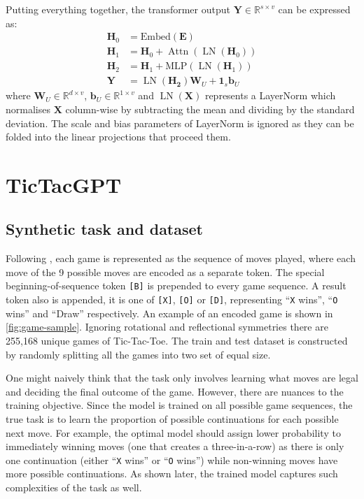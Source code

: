 \documentclass{article}
\newcommand{\ttgpt}{TicTacGPT\xspace}
\newcommand{\ttt}{Tic-Tac-Toe\xspace}
\renewcommand{\v}[1]{\mathbf{\bm{#1}}}
\newcommand{\m}[1]{\mathbf{\bm{#1}}}
\newcommand{\R}{\mathbb{R}}
\DeclareMathOperator{\layernorm}{LN}
\DeclareMathOperator{\attn}{Attn}
\begin{document}
Putting everything together, the transformer output $\m{Y} \in \R^{s \times v}$ can be expressed as:
\begin{equation}  \label{eq:transformer}
    \begin{aligned}
        \m{H}_0 & = \text{Embed}(\m{E})                           \\
        \m{H}_1 & = \m{H}_0 + \attn(\layernorm(\m{H}_0))          \\
        \m{H}_2 & = \m{H}_1 + \text{MLP}(\layernorm(\m{H}_1))     \\
        \m{Y}   & = \layernorm(\m{H_2}) \m{W}_U + \v{1}_s \v{b}_U
    \end{aligned}
\end{equation}
where $\m{W}_U \in \R^{d \times v}$, $\v{b}_U \in \R ^{1 \times v}$ and $\layernorm(\m{X})$ represents a LayerNorm which normalises $\m{X}$ column-wise by subtracting the mean and dividing by the standard deviation. The scale and bias parameters of LayerNorm is ignored as they can be folded into the linear projections that proceed them.

\section{\ttgpt}

\subsection{Synthetic task and dataset}



Following \cite{orthello-gpt}, each game is represented as the sequence of moves played, where each move of the 9 possible moves are encoded as a separate token. The special beginning-of-sequence token \texttt{[B]} is prepended to every game sequence. A result token also is appended, it is one of \texttt{[X]}, \texttt{[O]} or \texttt{[D]}, representing ``\texttt{X} wins'', ``\texttt{O} wins'' and ``Draw'' respectively. An example of an encoded game is shown in \cref{fig:game-sample}. Ignoring rotational and reflectional symmetries there are 255,168 unique games of \ttt. The train and test dataset is constructed by randomly splitting all the games into two set of equal size.

One might naively think that the task only involves learning what moves are legal and deciding the final outcome of the game. However, there are nuances to the training objective. Since the model is trained on all possible game sequences, the true task is to learn the proportion of possible continuations for each possible next move. For example, the optimal model should assign lower probability to immediately winning moves (one that creates a three-in-a-row) as there is only one continuation (either ``\texttt{X} wins'' or ``\texttt{O} wins'') while non-winning moves have more possible continuations. As shown later, the trained model captures such complexities of the task as well.
\end{document}
